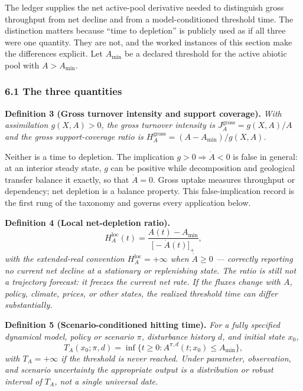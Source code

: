 \documentclass[11pt]{article}
\begin{document}
The ledger supplies the net active-pool derivative needed to distinguish
gross throughput from net decline and from a model-conditioned threshold
time. The distinction matters because ``time to depletion'' is publicly
used as if all three were one quantity. They are not, and the worked
instances of this section make the differences explicit. Let
\(A_{\min}\) be a declared threshold for the active abiotic pool with
\(A > A_{\min}\).

\subsubsection{6.1 The three quantities}\label{the-three-quantities}

\textbf{Definition 3 (Gross turnover intensity and support coverage).}
\emph{With assimilation \(g(X,A) > 0\), the gross turnover intensity is
\(J_A^{\mathrm{gross}} = g(X,A)/A\) and the gross support-coverage ratio
is \(H_A^{\mathrm{gross}} = (A - A_{\min})/g(X,A)\).}

Neither is a time to depletion. The implication
\(g > 0 \Rightarrow \dot A < 0\) is false in general: at an interior
steady state, \(g\) can be positive while decomposition and geological
transfer balance it exactly, so that \(\dot A = 0\). Gross uptake
measures throughput or dependency; net depletion is a balance property.
This false-implication record is the first rung of the taxonomy and
governs every application below.

\textbf{Definition 4 (Local net-depletion ratio).}
\[H_A^{\mathrm{loc}}(t) = \frac{A(t) - A_{\min}}{\bigl[ -\dot A(t) \bigr]_+},\]
\emph{with the extended-real convention \(H_A^{\mathrm{loc}} = +\infty\)
when \(\dot A \ge 0\) --- correctly reporting no current net decline at
a stationary or replenishing state. The ratio is still not a trajectory
forecast: it freezes the current net rate. If the fluxes change with
\(A\), policy, climate, prices, or other states, the realized threshold
time can differ substantially.}

\textbf{Definition 5 (Scenario-conditioned hitting time).} \emph{For a
fully specified dynamical model, policy or scenario \(\pi\), disturbance
history \(d\), and initial state \(x_0\),}
\[T_A(x_0; \pi, d) = \inf\{ t \ge 0 : A^{\pi,d}(t; x_0) \le A_{\min} \},\]
\emph{with \(T_A = +\infty\) if the threshold is never reached. Under
parameter, observation, and scenario uncertainty the appropriate output
is a distribution or robust interval of \(T_A\), not a single universal
date.}
\end{document}
